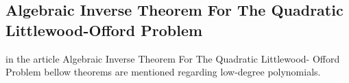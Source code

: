 
\subsection{Algebraic Inverse Theorem For The Quadratic Littlewood-Offord Problem}
in the article Algebraic Inverse Theorem For The Quadratic Littlewood-
Offord Problem \cite{kwan2019algebraic} bellow theorems are mentioned regarding low-degree polynomials.


 
